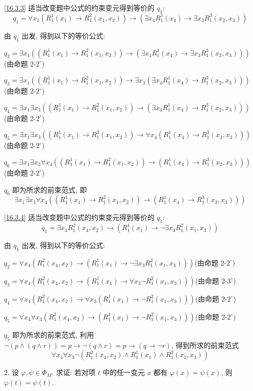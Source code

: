 \documentclass[boxes]{homework}
\begin{document}
\begin{solution}
    \ref{16.3.3} 适当改变题中公式的约束变元得到等价的 $q_1$:
    $$
        q_1 = \forall x_1(R_1^1(x_1)\to R_1^2(x_1, x_2))\to (\exists x_4 R_1^1(x_4)\to \exists x_3R_1^3(x_2, x_3))
    $$

    由 $q_1$ 出发, 得到以下的等价公式:

    $q_2=\exists x_1 ((R_1^1(x_1)\to R_1^2(x_1, x_2))\to (\exists x_4 R_1^1(x_4)\to \exists x_3R_1^3(x_2, x_3)))$\hfill (由命题 2-$2^\circ$)

    $q_3=\exists x_1 ((R_1^1(x_1)\to R_1^2(x_1, x_2))\to \exists x_3(\exists x_4 R_1^1(x_4)\to R_1^3(x_2, x_3)))$\hfill (由命题 2-$2^\circ$)

    $q_4=\exists x_1\exists x_3((R_1^1(x_1)\to R_1^2(x_1, x_2))\to(\exists x_4 R_1^1(x_4)\to R_1^3(x_2, x_3)))$\hfill (由命题 2-$2^\circ$)

    $q_5=\exists x_1\exists x_3((R_1^1(x_1)\to R_1^2(x_1, x_2))\to\forall x_4(R_1^1(x_4)\to R_1^3(x_2, x_3)))$\hfill (由命题 2-$2^\circ$)

    $q_6=\exists x_1\exists x_3\forall x_4((R_1^1(x_1)\to R_1^2(x_1, x_2))\to(R_1^1(x_4)\to R_1^3(x_2, x_3)))$\hfill (由命题 2-$2^\circ$)

    $q_6$ 即为所求的前束范式, 即
    $$
        \exists x_1\exists x_3\forall x_4((R_1^1(x_1)\to R_1^2(x_1, x_2))\to(R_1^1(x_4)\to R_1^3(x_2, x_3)))
    $$

    \vspace{1em}
    \ref{16.3.4} 适当改变题中公式的约束变元得到等价的 $q_1$:
    $$
        q_1 = \exists x_4 R_1^2(x_4, x_2)\to (R_1^1(x_1)\to \lnot \exists x_3 R_1^2 (x_1, x_3))
    $$

    由 $q_1$ 出发, 得到以下的等价公式:

    $q_2=\forall x_4(R_1^2(x_4, x_2)\to (R_1^1(x_1)\to \lnot \exists x_3 R_1^2(x_1, x_3)))$\hfill (由命题 2-$2^\circ$)

    $q_3=\forall x_4(R_1^2(x_4, x_2)\to (R_1^1(x_1)\to \forall x_3 \lnot R_1^2(x_1, x_3)))$\hfill (由命题 2-$3^\circ$)

    $q_4=\forall x_4(R_1^2(x_4, x_2)\to \forall x_3 (R_1^1(x_1)\to \lnot R_1^2(x_1, x_3)))$\hfill (由命题 2-$2^\circ$)

    $q_5=\forall x_4\forall x_3 (R_1^2(x_4, x_2)\to (R_1^1(x_1)\to \lnot R_1^2(x_1, x_3)))$\hfill (由命题 2-$2^\circ$)

    $q_5$ 即为所求的前束范式, 利用 $\lnot(p\land (q\land r)) = p\to \lnot (q\land r)=p\to (q\to\lnot r)$, 得到所求的前束范式
    $$
        \forall x_4\forall x_3 \lnot(R_1^2(x_4, x_2)\land R_1^1(x_1)\land R_1^2(x_1, x_3))
    $$
\end{solution}
\begin{problem}
2. 设 $\varphi, \psi \in \Phi_M$. 求证: 若对项 $t$ 中的任一变元 $x$ 都有 $\varphi(x)=\psi(x)$, 则 $\varphi(t)=\psi(t)$.
\end{problem}
\end{document}
